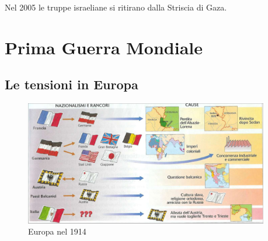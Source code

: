 \documentclass[a4paper]{article}
\begin{document}
Nel 2005 le truppe israeliane si ritirano dalla Striscia di Gaza.

\pagebreak

\section{Prima Guerra Mondiale}


\subsection{Le tensioni in Europa}

\begin{center}
\begin{figure}[th]
    \centering
    \includegraphics[width=0.95\textwidth]{./europa_1914.png}
    \caption{Europa nel 1914}
\end{figure}
\end{center}
\end{document}
